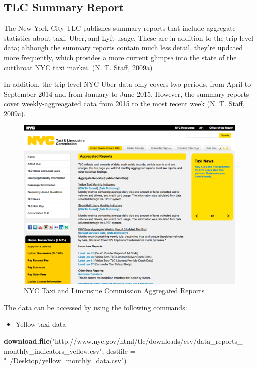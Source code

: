 \documentclass[12pt,twoside]{reedthesis}
\newenvironment{Shaded}{\begin{snugshade}}{\end{snugshade}}
\newcommand{\KeywordTok}[1]{\textcolor[rgb]{0.13,0.29,0.53}{\textbf{#1}}}
\newcommand{\DataTypeTok}[1]{\textcolor[rgb]{0.13,0.29,0.53}{#1}}
\newcommand{\StringTok}[1]{\textcolor[rgb]{0.31,0.60,0.02}{#1}}
\newcommand{\NormalTok}[1]{#1}
\providecommand{\tightlist}{%
  \setlength{\itemsep}{0pt}\setlength{\parskip}{0pt}}
\theoremstyle{definition}
\theoremstyle{definition}
\theoremstyle{definition}
\theoremstyle{remark}
\begin{document}
\subsection{TLC Summary Report}\label{tlc-summary-report}

The New York City TLC publishes summary reports that include aggregate
statistics about taxi, Uber, and Lyft usage. These are in addition to
the trip-level data; although the summary reports contain much less
detail, they're updated more frequently, which provides a more current
glimpse into the state of the cutthroat NYC taxi market. (N. T. Staff,
2009a)

In addition, the trip level NYC Uber data only covers two periods, from
April to September 2014 and from January to June 2015. However, the
summary reports cover weekly-aggreagated data from 2015 to the most
recent week (N. T. Staff, 2009c).
\begin{figure}[h]

{\centering \includegraphics[width=5.84in]{figure/a-report} 

}

\caption{NYC Taxi and Limousine Commission Aggregated Reports}\label{fig:a-report}
\end{figure}
The data can be accessed by using the following commands:
\begin{itemize}
\tightlist
\item
  Yellow taxi data
\end{itemize}
\begin{Shaded}
\begin{Highlighting}[]
\KeywordTok{download.file}\NormalTok{(}\StringTok{"http://www.nyc.gov/html/tlc/downloads/csv/data_reports_}
\StringTok{              monthly_indicators_yellow.csv"}\NormalTok{, }
              \DataTypeTok{destfile =} \StringTok{"~/Desktop/yellow_monthly_data.csv"}\NormalTok{)}
\end{Highlighting}
\end{Shaded}
\end{document}
